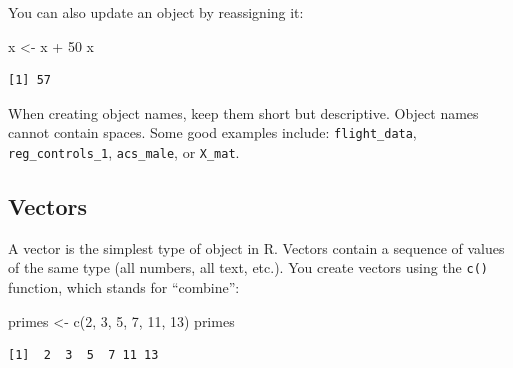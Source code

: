 \documentclass[
  letterpaper,
  DIV=11,
  numbers=noendperiod]{scrreprt}
\newenvironment{Shaded}{\begin{snugshade}}{\end{snugshade}}
\newcommand{\DecValTok}[1]{\textcolor[rgb]{0.68,0.00,0.00}{#1}}
\newcommand{\FunctionTok}[1]{\textcolor[rgb]{0.28,0.35,0.67}{#1}}
\newcommand{\NormalTok}[1]{\textcolor[rgb]{0.00,0.23,0.31}{#1}}
\newcommand{\OtherTok}[1]{\textcolor[rgb]{0.00,0.23,0.31}{#1}}
\newcommand{\SpecialCharTok}[1]{\textcolor[rgb]{0.37,0.37,0.37}{#1}}
\begin{document}
You can also update an object by reassigning it:

\begin{Shaded}
\begin{Highlighting}[]
\NormalTok{x }\OtherTok{\textless{}{-}}\NormalTok{ x }\SpecialCharTok{+} \DecValTok{50}
\NormalTok{x}
\end{Highlighting}
\end{Shaded}

\begin{verbatim}
[1] 57
\end{verbatim}

\begin{tcolorbox}[enhanced jigsaw, arc=.35mm, bottomrule=.15mm, bottomtitle=1mm, breakable, colback=white, colbacktitle=quarto-callout-tip-color!10!white, colframe=quarto-callout-tip-color-frame, coltitle=black, left=2mm, leftrule=.75mm, opacityback=0, opacitybacktitle=0.6, rightrule=.15mm, title=\textcolor{quarto-callout-tip-color}{\faLightbulb}\hspace{0.5em}{Naming Objects}, titlerule=0mm, toprule=.15mm, toptitle=1mm]

When creating object names, keep them short but descriptive. Object
names cannot contain spaces. Some good examples include:
\texttt{flight\_data}, \texttt{reg\_controls\_1}, \texttt{acs\_male}, or
\texttt{X\_mat}.

\end{tcolorbox}

\subsection{Vectors}\label{vectors}

A vector is the simplest type of object in R. Vectors contain a sequence
of values of the same type (all numbers, all text, etc.). You create
vectors using the \texttt{c()} function, which stands for ``combine'':

\begin{Shaded}
\begin{Highlighting}[]
\NormalTok{primes }\OtherTok{\textless{}{-}} \FunctionTok{c}\NormalTok{(}\DecValTok{2}\NormalTok{, }\DecValTok{3}\NormalTok{, }\DecValTok{5}\NormalTok{, }\DecValTok{7}\NormalTok{, }\DecValTok{11}\NormalTok{, }\DecValTok{13}\NormalTok{)}
\NormalTok{primes}
\end{Highlighting}
\end{Shaded}

\begin{verbatim}
[1]  2  3  5  7 11 13
\end{verbatim}
\end{document}
